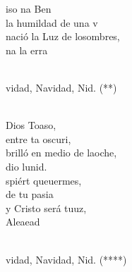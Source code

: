 \begin{cancion}
	iso na Ben  \\
	la humildad de una v\\
	nació la Luz de losombres, \\
	na    la erra \\\jump\\
	\begin{chorus}%
	vidad, Navidad, Nid. (**)\\
	\end{chorus}%
	\jump\\
	 Dios Toaso, \\
	entre ta oscuri,\\
	brilló en medio de laoche,\\
	dio  lunid.\\
	spiért queuermes, \\
	 de tu pasia\\
	y Cristo será tuuz, \\
	Aleaead\\\jump\\
	\begin{chorus}%
	vidad, Navidad, Nid. (****)\\
	\end{chorus}%
	\jump\\
\end{cancion}%
